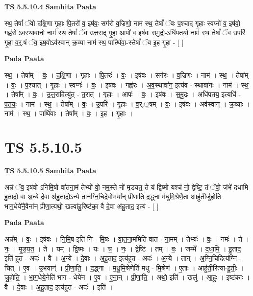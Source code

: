 \documentclass[17pt]{extarticle}
\begin{document}
\textbf{TS 5.5.10.4 } \newline
\textbf{Samhita Paata} \newline

स्थ॒ तेषां᳚ ॅवो दक्षि॒णा गृ॒हाः पि॒तरो॑ व॒ इष॑वः॒ सग॑रो व॒ज्रिणो॒ नाम॑ स्थ॒ तेषां᳚ ॅवः प॒श्चाद् गृ॒हाः स्वप्नो॑ व॒ इष॑वो॒ गह्व॑रो ऽव॒स्थावा॑नो॒ नाम॑ स्थ॒ तेषां᳚ ॅव उत्त॒राद् गृ॒हा आपो॑ व॒ इष॑वः समु॒द्रो-ऽधि॑पतयो॒ नाम॑ स्थ॒ तेषां᳚ ॅव उ॒परि॑ गृ॒हा व॒र्॒.षं ॅव॒ इष॒वोऽव॑स्वान् क्र॒व्या नाम॑ स्थ॒ पार्त्थि॑वा॒-स्तेषां᳚ ॅव इ॒ह गृ॒हा - [  ] \newline

\textbf{Pada Paata} \newline

स्थ॒ । तेषा᳚म् । वः॒ । द॒क्षि॒णा । गृ॒हाः । पि॒तरः॑ । वः॒ । इष॑वः । सग॑रः । व॒ज्रिणः॑ । नाम॑ । स्थ॒ । तेषा᳚म् । वः॒ । प॒श्चात् । गृ॒हाः । स्वप्नः॑ । वः॒ । इष॑वः । गह्व॑रः । अ॒व॒स्थावा॑न॒ इत्य॑व - स्थावा॑नः । नाम॑ । स्थ॒ । तेषा᳚म् । वः॒ । उ॒त्त॒रादित्यु॑त् - त॒रात् । गृ॒हाः । आपः॑ । वः॒ । इष॑वः । स॒मु॒द्रः । अधि॑पतय॒ इत्यधि॑ - प॒त॒यः॒ । नाम॑ । स्थ॒ । तेषा᳚म् । वः॒ । उ॒परि॑ । गृ॒हाः । व॒र्.॒षम् । वः॒ । इष॑वः । अव॑स्वान् । क्र॒व्याः । नाम॑ । स्थ॒ । पार्थि॑वाः । तेषा᳚म् । वः॒ । इ॒ह । गृ॒हाः ।  \newline




\section*{ TS 5.5.10.5 }

\textbf{TS 5.5.10.5 } \newline
\textbf{Samhita Paata} \newline

अन्नं॑ ॅव॒ इष॑वो ऽनिमि॒षो वा॑तना॒मं तेभ्यो॑ वो॒ नम॒स्ते नो॑ मृडयत॒ ते यं द्वि॒ष्मो यश्च॑ नो॒ द्वेष्टि॒ तं ॅवो॒ जंभे॑ दधामि हु॒तादो॒ वा अ॒न्ये दे॒वा अ॑हु॒तादो॒ऽन्ये तान॑ग्नि॒चिदे॒वोभया᳚न् प्रीणाति द॒द्ध्ना म॑धुमि॒श्रेणै॒ता आहु॑तीर्जुहोति भाग॒धेये॑नै॒वैना᳚न् प्रीणा॒त्यथो॒ खल्वा॑हु॒रिष्ट॑का॒ वै दे॒वा अ॑हु॒ताद॒ इत्य॑ - [  ] \newline

\textbf{Pada Paata} \newline

अन्न᳚म् । वः॒ । इष॑वः । नि॒मि॒ष इति॑ नि - मि॒षः । वा॒त॒ना॒ममिति॑ वात - ना॒मम् । तेभ्यः॑ । वः॒ । नमः॑ । ते । नः॒ । मृ॒ड॒य॒त॒ । ते । यम् । द्वि॒ष्मः । यः । च॒ । नः॒ । द्वेष्टि॑ । तम् । वः॒ । जम्भे᳚ । द॒धा॒मि॒ । हु॒ताद॒ इति॑ हुत - अदः॑ । वै । अ॒न्ये । दे॒वाः । अ॒हु॒ताद॒ इत्य॑हुत - अदः॑ । अ॒न्ये । तान् । अ॒ग्नि॒चिदित्य॑ग्नि - चित् । ए॒व । उ॒भयान्॑ । प्री॒णा॒ति॒ । द॒द्ध्ना । म॒धु॒मि॒श्रेणेति॑ मधु - मि॒श्रेण॑ । ए॒ताः । आहु॑ती॒रित्या-हु॒तीः॒ । जु॒हो॒ति॒ । भा॒ग॒धेये॒नेति॑ भाग - धेये॑न । ए॒व । ए॒ना॒न् । प्री॒णा॒ति॒ । अथो॒ इति॑ । खलु॑ । आ॒हुः॒ । इष्ट॑काः । वै । दे॒वाः । अ॒हु॒ताद॒ इत्य॑हुत - अदः॑ । इति॑ ।  \newline
\end{document}
